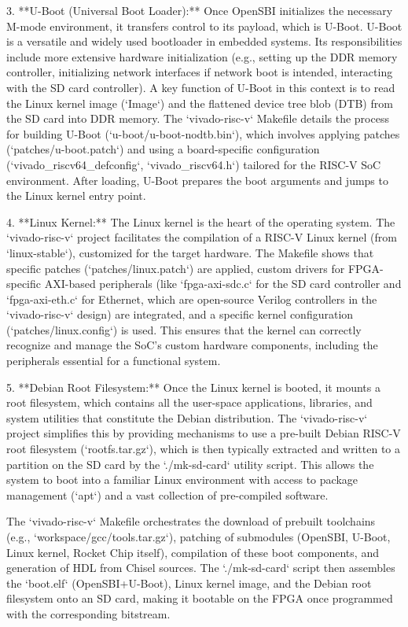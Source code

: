 3.  **U-Boot (Universal Boot Loader):** Once OpenSBI initializes the necessary M-mode environment, it transfers control to its payload, which is U-Boot. U-Boot is a versatile and widely used bootloader in embedded systems. Its responsibilities include more extensive hardware initialization (e.g., setting up the DDR memory controller, initializing network interfaces if network boot is intended, interacting with the SD card controller). A key function of U-Boot in this context is to read the Linux kernel image (`Image`) and the flattened device tree blob (DTB) from the SD card into DDR memory. The `vivado-risc-v` Makefile details the process for building U-Boot (`u-boot/u-boot-nodtb.bin`), which involves applying patches (`patches/u-boot.patch`) and using a board-specific configuration (`vivado\_riscv64\_defconfig`, `vivado\_riscv64.h`) tailored for the RISC-V SoC environment. After loading, U-Boot prepares the boot arguments and jumps to the Linux kernel entry point.

4.  **Linux Kernel:** The Linux kernel is the heart of the operating system. The `vivado-risc-v` project facilitates the compilation of a RISC-V Linux kernel (from `linux-stable`), customized for the target hardware. The Makefile shows that specific patches (`patches/linux.patch`) are applied, custom drivers for FPGA-specific AXI-based peripherals (like `fpga-axi-sdc.c` for the SD card controller and `fpga-axi-eth.c` for Ethernet, which are open-source Verilog controllers in the `vivado-risc-v` design) are integrated, and a specific kernel configuration (`patches/linux.config`) is used. This ensures that the kernel can correctly recognize and manage the SoC's custom hardware components, including the peripherals essential for a functional system.

5.  **Debian Root Filesystem:** Once the Linux kernel is booted, it mounts a root filesystem, which contains all the user-space applications, libraries, and system utilities that constitute the Debian distribution. The `vivado-risc-v` project simplifies this by providing mechanisms to use a pre-built Debian RISC-V root filesystem (`rootfs.tar.gz`), which is then typically extracted and written to a partition on the SD card by the `./mk-sd-card` utility script. This allows the system to boot into a familiar Linux environment with access to package management (`apt`) and a vast collection of pre-compiled software.

The `vivado-risc-v` Makefile orchestrates the download of prebuilt toolchains (e.g., `workspace/gcc/tools.tar.gz`), patching of submodules (OpenSBI, U-Boot, Linux kernel, Rocket Chip itself), compilation of these boot components, and generation of HDL from Chisel sources. The `./mk-sd-card` script then assembles the `boot.elf` (OpenSBI+U-Boot), Linux kernel image, and the Debian root filesystem onto an SD card, making it bootable on the FPGA once programmed with the corresponding bitstream.

